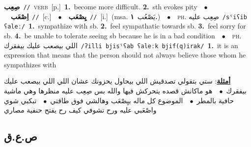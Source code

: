 \documentclass[10pt,a4paper,twoside]{article} %
\begin{document}
\begin{multicols}{2}
{\setlength\topsep{0pt}\textbf{\foreignlanguage{arabic}{صِعِب}}\ {\color{gray}\texttt{//}\color{black}}\ \textsc{verb}\ [p.]\ \textbf{1.}~become more difficult.  \textbf{2.}~sth evokes pity\ \ $\bullet$\ \ \setlength\topsep{0pt}\textbf{\foreignlanguage{arabic}{اِصْعَب}}\ {\color{gray}\texttt{//}\color{black}}\ [c.]\ \ $\bullet$\ \ \setlength\topsep{0pt}\textbf{\foreignlanguage{arabic}{يِصْعَب}}\ {\color{gray}\texttt{//}\color{black}}\ [i.]\ \color{gray}(msa. \foreignlanguage{arabic}{يَصْعُب}~\foreignlanguage{arabic}{\textbf{١.}})\color{black}\ \ $\bullet$\ \ \textsc{ph.} \color{gray} \foreignlanguage{arabic}{صِعِب عليه}\color{black}\ {\color{gray}\texttt{/{\sffamily sˤiʕib ʕaleː}/}\color{black}}\ \textbf{1.}~sympathize with sb.  \textbf{2.}~feel sympathatic towards sb.  \textbf{3.}~feel sorry for sb.  \textbf{4.}~be unable to tolerate seeing sb because he is in a bad condition\ \ $\bullet$\ \ \textsc{ph.} \color{gray} \foreignlanguage{arabic}{اللي بيصعب عليك بيفقرك}\color{black}\ {\color{gray}\texttt{/{\sffamily ʔilli bjisˤʕab ʕaleːk bjif(q)irak}/}\color{black}}\ \textbf{1.}~it is an expression that means that the person should not always believe those whom he sympathizes with\  \begin{flushright}\color{gray}\foreignlanguage{arabic}{\textbf{\underline{\foreignlanguage{arabic}{أمثلة}}}: ستي بتقولي تصدقيش اللي بيحاول يحزونك عشان اللي اللي بيصعب عليك بيفقرك\ $\bullet$\ \  هو ماكانش قصده يتحركش فيها والله بس صِعِب عليه منظرها وهي ماشية حافية بالمطر\ $\bullet$\ \  الموضوع كل ماله بيِصْعَب وهالشي فوق طاقتي\ $\bullet$\ \  تبكبي شوي واصْعَبي عليه ورح تشوفي كيف رح يفتح حنفية مصاري}\end{flushright}\color{black}} \vspace{2mm}

\vspace{-3mm}
\subsection*{\color{blue}\foreignlanguage{arabic}{ص.ع.ق}\color{blue}{}} 


\end{multicols}
\end{document}
